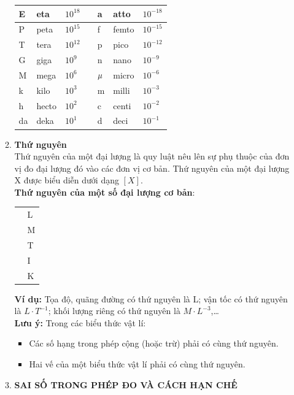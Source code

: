\begin{enumerate}[label=\bfseries\Roman*.]
\begin{enumerate}[label=\bfseries\arabic*.]
\begin{center}
\begin{longtable}{|M{2cm}|M{2cm}|M{2cm}|a{0.5cm}|M{2cm}|M{2cm}|M{2cm}|}
			\hline
			E &eta& $10^{18}$&&a & atto &$10^{-18}$\\ 
			\hline
			P &peta& $10^{15}$&&f & femto &$10^{-15}$\\ 
			\hline
			T &tera& $10^{12}$&&p & pico &$10^{-12}$\\ 
			\hline
			G &giga& $10^{9}$&&n & nano &$10^{-9}$\\ 
			\hline
			M &mega& $10^{6}$&&$\mathnormal{\mu}$ & micro &$10^{-6}$\\ 
			\hline
			k &kilo& $10^{3}$&&m & milli &$10^{-3}$\\ 
			\hline
			h &hecto& $10^{2}$&&c & centi &$10^{-2}$\\ 
			\hline
			da &deka& $10^{1}$&&d & deci &$10^{-1}$\\ 
			\hline
		\end{longtable}
	\end{center}
\item \textbf{Thứ nguyên}\\
Thứ nguyên của một đại lượng là quy luật nêu lên sự phụ thuộc của đơn vị đo đại lượng đó vào các đơn vị cơ bản. Thứ nguyên của một đại lượng X được biểu diễn dưới dạng $\left[X\right]$.\\
\textbf{Thứ nguyên của một số đại lượng cơ bản}:
\begin{center}
	\begin{longtable}{|M{6cm}|M{6cm}|}
		\hline
		&\\
		 & L\\
		 & M\\
		 & T\\
		 & I\\
		\hline
		[Nhiệt độ]&K\\
		\hline
	\end{longtable}
\end{center}
\textbf{Ví dụ:} Tọa độ, quãng đường có thứ nguyên là L; vận tốc có thứ nguyên là $L\cdot T^{-1}$; khối lượng riêng có thứ nguyên là $M\cdot L^{-3}$,\dots\\
\textbf{Lưu ý:} Trong các biểu thức vật lí:
\begin{itemize}
	\item Các số hạng trong phép cộng (hoặc trừ) phải có cùng thứ
	nguyên.
	\item Hai vế của một biểu thức vật lí phải có cùng thứ nguyên.
\end{itemize}
\item \textbf{SAI SỐ TRONG PHÉP ĐO VÀ CÁCH HẠN CHẾ}\\

\end{enumerate}
\end{enumerate}
